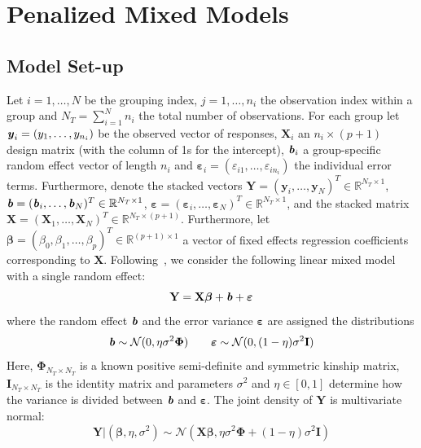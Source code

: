 \documentclass[12pt,letter]{article}\usepackage[]{graphicx}\usepackage[]{color}
\newcommand{\by}{\textbf{\emph{y}}}
\newcommand{\bX}{\textbf{X}}
\newcommand{\bY}{\textbf{Y}}
\newcommand{\bb}{\textbf{\emph{b}}}
\newcommand{\bI}{\textbf{I}}
\newcommand{\be}{\boldsymbol{\varepsilon}}
\newcommand{\bbeta}{\boldsymbol{\beta}}
\newcommand{\bPhi}{\boldsymbol{\Phi}}
\begin{document}
\FloatBarrier






\section{Penalized Mixed Models}

\subsection{Model Set-up}

Let $i = 1, \ldots, N$ be the grouping index, $j = 1, \ldots, n_i$ the observation index within a group and $N_T = \sum_{i=1}^{N} n_i$ the total number of observations. For each group let \mbox{$\by_i = (y_1, \ldots, y_{n_i})$} be the observed vector of responses, $\bX_i$ an $n_i \times (p + 1)$ design matrix (with the column of 1s for the intercept), $\bb_i$ a group-specific random effect vector of length $n_i$ and \mbox{$\be_i = (\varepsilon_{i1}, \ldots, \varepsilon_{in_i})$} the individual error terms. Furthermore, denote the stacked vectors \mbox{$\bY = (\textbf{y}_i, \ldots, \textbf{y}_N)^T \in \mathbb{R}^{N_T \times 1}$}, $\bb = (\bb_i, \ldots, \bb_N)^T \in \mathbb{R}^{N_T \times 1}$, \mbox{$\be = (\be_i, \ldots, \be_N)^T \in \mathbb{R}^{N_T \times 1}$}, and the stacked matrix \mbox{$\bX = (\bX_1, \ldots, \bX_N)^T \in \mathbb{R}^{N_T \times (p + 1)}$}. Furthermore, let $\bbeta = (\beta_0,\beta_1, \ldots, \beta_p)^T \in \mathbb{R}^{(p+1) \times 1}$ a vector of fixed effects regression coefficients corresponding to $\bX$. Following~\cite{pirinen2013efficient}, we consider the following linear mixed model with a single random effect:
\begin{equation}
	\bY = \bX \bbeta + \bb + \be
\end{equation}
where the random effect $\bb$ and the error variance $\be$ are assigned the distributions
\begin{equation}
	\bb \sim \mathcal{N}(0, \eta \sigma^2 \bPhi) \qquad \be \sim \mathcal{N}(0, (1-\eta)\sigma^2 \bI)
\end{equation}
Here, $\bPhi_{N_T \times N_T}$ is a known positive semi-definite and symmetric kinship matrix, $\bI_{N_T \times N_T}$ is the identity matrix and parameters $\sigma^2$ and $\eta \in [0,1]$ determine how the variance is divided between $\bb$ and $\be$. The joint density of $\bY$ is multivariate normal:
\begin{equation}
	\bY | (\bbeta, \eta, \sigma^2) \sim \mathcal{N}(\bX \bbeta, \eta \sigma^2 \bPhi + (1-\eta)\sigma^2 \bI) \label{eq:prinen}
\end{equation}
\end{document}
